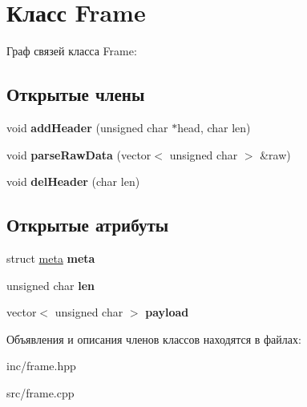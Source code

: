 \hypertarget{classFrame}{}\section{Класс Frame}
\label{classFrame}


Граф связей класса Frame\+:
\subsection*{Открытые члены}
\begin{DoxyCompactItemize}
\item 
\mbox{\label{classFrame_aa3f98757207f815181e9042e0cd8d1ee}} 
void {\bfseries add\+Header} (unsigned char $\ast$head, char len)
\item 
\mbox{\label{classFrame_ab5ea62775d91f4e653fcd52952fa1d3e}} 
void {\bfseries parse\+Raw\+Data} (vector$<$ unsigned char $>$ \&raw)
\item 
\mbox{\label{classFrame_a802d4c73bb22cb7185fdcd83e69efcb7}} 
void {\bfseries del\+Header} (char len)
\end{DoxyCompactItemize}
\subsection*{Открытые атрибуты}
\begin{DoxyCompactItemize}
\item 
\mbox{\label{classFrame_a42d43d986443fd544d0d9517cfcdcb6a}} 
struct \hyperlink{structmeta}{meta} {\bfseries meta}
\item 
\mbox{\label{classFrame_a9fd98c626bbb063a4895fcdb76dfc3e7}} 
unsigned char {\bfseries len}
\item 
\mbox{\label{classFrame_aa21300efdb7e1dfff11153c39cda931c}} 
vector$<$ unsigned char $>$ {\bfseries payload}
\end{DoxyCompactItemize}


Объявления и описания членов классов находятся в файлах\+:\begin{DoxyCompactItemize}
\item 
inc/frame.\+hpp\item 
src/frame.\+cpp\end{DoxyCompactItemize}
